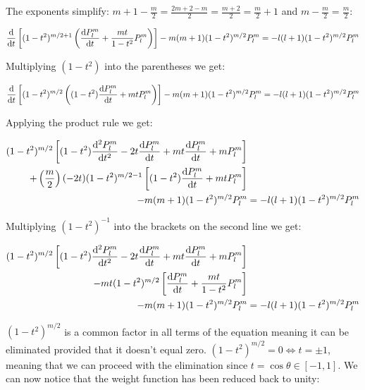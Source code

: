 \documentclass{article}
\begin{document}
    The exponents simplify: $m + 1 - \frac{m}{2} = \frac{2m + 2 - m}{2} = \frac{m + 2}{2} = \frac{m}{2} + 1$ and $m - \frac{m}{2} = \frac{m}{2}$:

    \begin{equation}
        \odv{}{t}\left[ (1 - t^2)^{m/2 + 1}\left(\odv{P^{m}_{l}}{t} + \frac{mt}{1 - t^2}P^{m}_{l}\right)\right]
        - m(m + 1)(1 - t^2)^{m/2}P^{m}_{l} = -l(l + 1)(1 - t^2)^{m/2}P^{m}_{l}
    \end{equation}

    Multiplying $(1 - t^2)$ into the parentheses we get:

    \begin{equation}
        \odv{}{t}\left[ (1 - t^2)^{m/2}\left((1 - t^2)\odv{P^{m}_{l}}{t} + mtP^{m}_{l}\right)\right]
        - m(m + 1)(1 - t^2)^{m/2}P^{m}_{l} = -l(l + 1)(1 - t^2)^{m/2}P^{m}_{l}
    \end{equation}

    Applying the product rule we get:  

    \begin{equation}
        \begin{aligned}
            (1 - t^2)^{m/2}\left[(1 - t^2)\odv[order = 2]{P^{m}_{l}}{t} - 2t\odv{P^{m}_{l}}{t} + mt\odv{P^{m}_{l}}{t} + mP^{m}_{l}\right]& \\
            + \left(\frac{m}{2} \right)(-2t)(1 - t^2)^{m/2 - 1}\left[(1 - t^2)\odv{P^{m}_{l}}{t} + mtP^{m}_{l}\right]& \\
            - m(m + 1)(1 - t^2)^{m/2}P^{m}_{l} &= -l(l + 1)(1 - t^2)^{m/2}P^{m}_{l}
        \end{aligned}
    \end{equation}

    Multiplying $(1 - t^2)^{-1}$ into the brackets on the second line we get:

    \begin{equation}
        \begin{aligned}
            (1 - t^2)^{m/2}\left[(1 - t^2)\odv[order = 2]{P^{m}_{l}}{t} - 2t\odv{P^{m}_{l}}{t} + mt\odv{P^{m}_{l}}{t} + mP^{m}_{l}\right]& \\
            - mt(1 - t^2)^{m/2}\left[\odv{P^{m}_{l}}{t} + \frac{mt}{1 - t^2}P^{m}_{l}\right]& \\
            - m(m + 1)(1 - t^2)^{m/2}P^{m}_{l} &= -l(l + 1)(1 - t^2)^{m/2}P^{m}_{l}
        \end{aligned}
    \end{equation}

    $(1 - t^2)^{m/2}$ is a common factor in all terms of the equation meaning it can be eliminated provided that it doesn't equal zero. $(1 - t^2)^{m/2} = 0 \iff t = \pm1$, meaning
    that we can proceed with the elimination since $t = \cos\theta \in [-1, 1]$. We can now notice that the weight function has been reduced back to unity:
\end{document}
